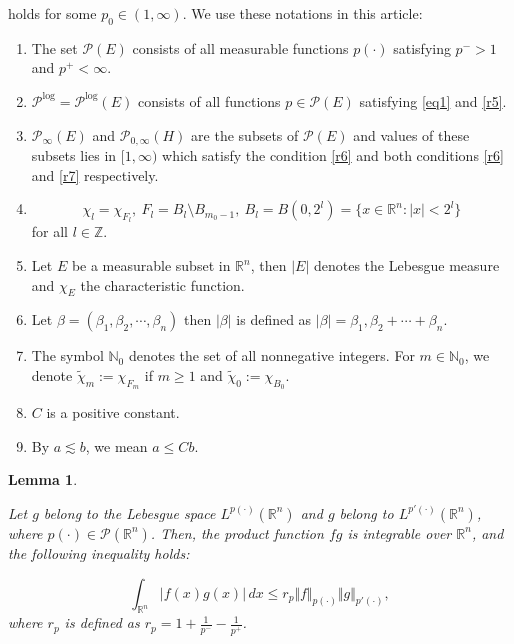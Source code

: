 \documentclass[oneside,reqno]{amsart}
\newtheorem{lem}[theorem]{Lemma}
\numberwithin{equation}{section}
\theoremstyle{definition}
\begin{document}
holds for some $p_0 \in (1, \infty)$.
We use these notations in this article:
\begin{enumerate}
	\item[(i)] The set $\mathcal{P}(E)$  {consists} of all measurable functions $p(\cdot)$ satisfying	$	p^-> 1$ and $p^+< \infty.$
	
	\item[(ii)] $\mathcal{P}^{\log} = \mathcal{P}^{\log}(E)$  {consists} of all functions $p \in \mathcal{P}(E)$ satisfying \eqref{eq1}  and \eqref{r5}.
	
	\item[(iii)]  $\mathcal{P}_\infty (E)$ and $\mathcal{P}_{0,\infty} (H)$ are the subsets of $\mathcal{P}(E)$ and  values of these subsets lies in $[1, \infty)$  which  satisfy the  condition \eqref{r6} and both conditions \eqref{r6} and \eqref{r7} respectively. 
	\item[(iv)]  $$\chi _ l =\chi_{F_l},\ F_l=B_l \setminus B_{m_0-1},\ B_l=B(0,2^l)=\{x \in \mathbb{R}^n : |x| < 2^l\}$$ for all $l\in  \mathbb{Z}$.
 \item[(v)] Let $E$ be a measurable subset in $\mathbb{R}^{n}$, then $|E|$ denotes the Lebesgue measure and $\chi_{E}$ the characteristic function.
    \item[(vi)] Let $\beta=(\beta_1,\beta_2,\cdots,\beta_n)$ then $|\beta|$ is defined as $|\beta|=\beta_1,\beta_2+\cdots+\beta_n$.
    \item[(vii)] The symbol $\mathbb{N}_{0}$ denotes the set of all nonnegative integers. For $m \in \mathbb{N}_{0}$, we denote $\tilde{\chi}_{m}:=\chi_{F_{m}}$ if $m \geq 1$ and $\tilde{\chi}_{0}:=\chi_{B_{0}}$. 
    \item[(viii)] $C$ is a positive constant.
    \item[(ix)] By $a \lesssim b$, we mean $a \leq C b$. 
\end{enumerate}




\begin{lem}\cite{n19}


Let $g$ belong to the Lebesgue space $L^{p(\cdot)}(\mathbb{R}^{n})$ and $g$ belong to $L^{p'(\cdot)}(\mathbb{R}^{n})$, where $p(\cdot)\in \mathcal{P}(\mathbb{R}^{n})$. Then, the product function $fg$ is integrable over $\mathbb{R}^{n}$, and the following inequality holds:



$$\int_{\mathbb{R}^{n}} \bigl\vert f(x)g(x) \bigr\vert \,dx \leq r_{p} \Vert f \Vert _{{p(\cdot )}} \Vert g \Vert _{{p'(\cdot)}},$$
where $r_{p}$ is defined as $r_{p}=1+\frac{1}{p^{-}} -\frac{1}{p^{+}}$.
\end{lem}
\end{document}
